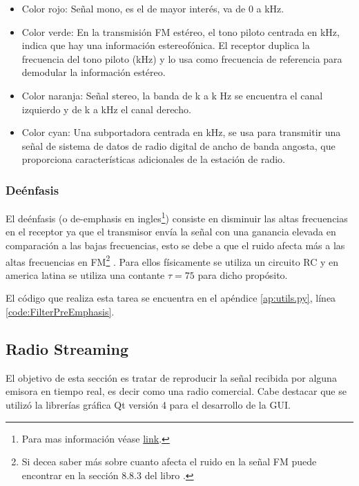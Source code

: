 \begin{itemize}
	\item Color rojo: Señal mono, es el de mayor interés, va de 0 a \limitMono kHz.
	\item Color verde: En la transmisión FM estéreo, el tono piloto centrada en \pilotTone kHz, indica que hay una información estereofónica. El receptor duplica la frecuencia del tono piloto (\centeredStereo kHz) y lo usa como frecuencia de referencia para demodular la información estéreo.
	\item Color naranja: Señal stereo, la banda de \leftLimitStereo k a \centeredStereo k Hz se encuentra el canal izquierdo y de \centeredStereo k a \rightLimitStereo kHz el canal derecho.
	\item Color cyan: Una subportadora centrada en \digitalCarrier kHz, se usa para transmitir una señal de sistema de datos de radio digital de ancho de banda angosta, que proporciona características adicionales de la estación de radio.
\end{itemize}

\subsubsection{Deénfasis}
El deénfasis (o de-emphasis en ingles\footnote{Para mas información véase \href{https://en.wikipedia.org/wiki/FM\_broadcasting\#Pre-emphasis\_and_de-emphasis}{link}.}) consiste en disminuir las altas frecuencias en el receptor ya que el transmisor envía la señal con una ganancia elevada en comparación a las bajas frecuencias, esto se debe a que el ruido afecta más a las altas frecuencias en FM\footnote{Si decea saber más sobre cuanto afecta el ruido en la señal FM puede encontrar en la sección 8.8.3 del libro \cite{PrinciplesofCommunications}.}
.
Para ellos físicamente se utiliza un circuito RC y en america latina se utiliza una contante $\tau = 75$ para dicho propósito.

El código que realiza esta tarea se encuentra en el apéndice \ref{ap:utils.py}, línea \ref{code:FilterPreEmphasis}.


\subsection{Radio Streaming}\label{sec:radio}

El objetivo de esta sección es tratar de reproducir la señal recibida por alguna emisora en tiempo real, es decir como una radio comercial. Cabe destacar que se utilizó la librerías gráfica Qt versión 4 para el desarrollo de la GUI.

